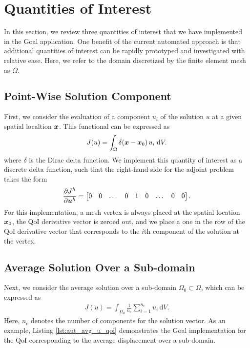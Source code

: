 \section{Quantities of Interest}

In this section, we review three quantities of interest that we have
implemented in the Goal application. One benefit of the current automated
approach is that additional quantities of interest can be rapidly
prototyped and investigated with relative ease. Here, we refer to the
domain discretized by the finite element mesh as $\Omega$.

\subsection{Point-Wise Solution Component}

First, we consider the evaluation of a component $u_i$ of the solution $u$
at a given spatial localtion $\boldsymbol{x}$. This functional can be expressed as
%
\begin{gather}
J(u) = \int_{\Omega} \delta ( \boldsymbol{x} - \boldsymbol{x}_0 ) \, u_i \; \text{d} V.
\label{eq:aut_pw_qoi}
\end{gather}
%
where $\delta$ is the Dirac delta function. We implement this quantity of
interest as a discrete delta function, such that the right-hand side for
the adjoint problem takes the form
%
\begin{gather}
\frac{\partial J^h}{\partial \boldsymbol{u}^h} =
\begin{bmatrix}
0 & 0 & \dots & 0 & 1 & 0 & \dots & 0 & 0
\end{bmatrix}.
\label{eq:aut_discrete_delta}
\end{gather}
%
For this implementation, a mesh vertex is always placed at the spatial
location $\boldsymbol{x}_0$, the QoI derivative vector is zeroed out, and we place a
one in the row of the QoI derivative vector that corresponds to the $i$th
component of the solution at the vertex.

\subsection{Average Solution Over a Sub-domain}

Next, we consider the average solution over a sub-domain
$\Omega_0 \subset \Omega$, which can be expressed as
%
\begin{gather}
J(u) = \int_{\Omega_0} \frac{1}{n_c} \sum_{i=1}^{n_c} u_i \, \text{d} V.
\label{eq:aut_avg_u_qoi}
\end{gather}
%
Here, $n_c$ denotes the number of components for the solution vector. As an
example, Listing \ref{lst:aut_avg_u_qoi} demonstrates the Goal implementation
for the QoI corresponding to the average displacement over a sub-domain.

